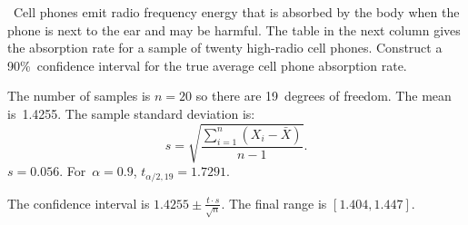 \begin{problem}
  ~Cell phones emit radio frequency energy that is absorbed by the body when the phone is next to the ear and may be harmful.  The table in the next column gives the absorption rate for a sample of twenty high-radio cell phones.  Construct a 90\%~confidence interval for the true average cell phone absorption rate.
\end{problem}

The number of samples is ${n=20}$ so there are 19~degrees of freedom.  The mean is~1.4255.  The sample standard deviation is:
\begin{equation}\label{eq:SampleStdDev}
  s = \sqrt{\frac{\sum_{i=1}^{n} (X_i - \bar{X})}{n - 1}}\text{.}
\end{equation}
\noindent
${s = 0.056}$. For~${\alpha = 0.9}$, ${t_{\alpha / 2,19} = 1.7291}$.

The confidence interval is ${1.4255 \pm \frac{t \cdot s}{\sqrt{n}}}$.  The final range is ${[1.404,1.447]}$.

